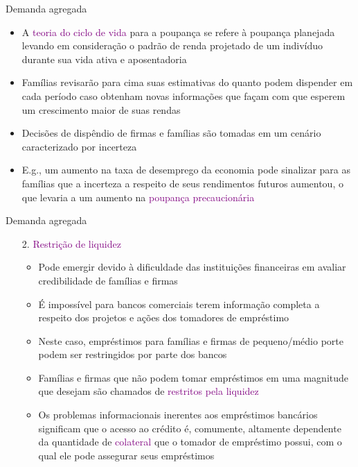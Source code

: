 \documentclass[10pt]{beamer}
\begin{document}
\begin{frame}{Demanda agregada}
    \begin{itemize}
        \item A \textcolor{purple}{teoria do ciclo de vida} para a poupança se refere à poupança planejada levando em consideração o padrão de renda projetado de um indivíduo durante sua vida ativa e aposentadoria\bigskip
         
        \item Famílias revisarão para cima suas estimativas do quanto podem dispender  em cada período caso obtenham novas informações que façam com que esperem um crescimento maior de suas rendas\bigskip
         
        \item Decisões de dispêndio de firmas e famílias são tomadas em um cenário caracterizado por incerteza\bigskip
         
        \item E.g., um aumento na taxa de desemprego da economia pode sinalizar para as famílias que a incerteza a respeito de seus rendimentos futuros aumentou, o que levaria a um aumento na \textcolor{purple}{poupança precaucionária}
    \end{itemize}
\end{frame}

\begin{frame}{Demanda agregada}
    \begin{enumerate}
        
        \item[2.] \textcolor{purple}{Restrição de liquidez}\bigskip
         
        \begin{itemize}
            \item Pode emergir devido à dificuldade das instituições financeiras em avaliar credibilidade de famílias e firmas\medskip
             
            \item É impossível para bancos comerciais terem informação completa a respeito dos projetos e ações dos tomadores de empréstimo\medskip
             
            \item Neste caso, empréstimos para famílias e firmas de pequeno/médio porte podem ser restringidos por parte dos bancos\medskip
             
            \item Famílias e firmas que não podem tomar empréstimos em uma magnitude que desejam são chamados de \textcolor{purple}{restritos pela liquidez}\medskip
             
            \item Os problemas informacionais inerentes aos empréstimos bancários significam que o acesso ao crédito é, comumente, altamente dependente da quantidade de \textcolor{purple}{colateral} que o tomador de empréstimo possui, com o qual ele pode assegurar seus empréstimos
        \end{itemize}        
    \end{enumerate}
\end{frame}
\end{document}
